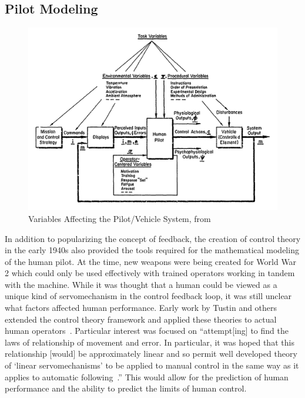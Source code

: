 \documentclass[float=false, crop=false]{standalone}
\begin{document}
\subsection{Pilot Modeling}
\begin{figure}[tb]
    \begin{center}
        \includegraphics[width=0.8\linewidth]{./../img/Screen Shot 2018-07-25 at 10.37.08 AM.png}
        \caption{Variables Affecting the Pilot/Vehicle System, from~\cite{McRuer1974}}
        \label{figure:mcruer1974}
    \end{center}
\end{figure}

In addition to popularizing the concept of feedback, the creation of control theory in the early 1940s also provided the tools required for the mathematical modeling of the human pilot.
At the time, new weapons were being created for World War 2 which could only be used effectively with trained operators working in tandem with the machine.
While it was thought that a human could be viewed as a unique kind of servomechanism in the control feedback loop, it was still unclear what factors affected human performance.
Early work by Tustin and others extended the control theory framework and applied these theories to actual human operators~\cite{tustininvestigation}.
Particular interest was focused on ``attempt[ing] to find the laws of relationship of movement and error. In particular, it was hoped that this relationship [would] be approximately linear and so permit well developed theory of `linear servomechanisms' to be applied to manual control in the same way as it applies to automatic following~\cite{tustininvestigation}.''
This would allow for the prediction of human performance and the ability to predict the limits of human control.
\end{document}
